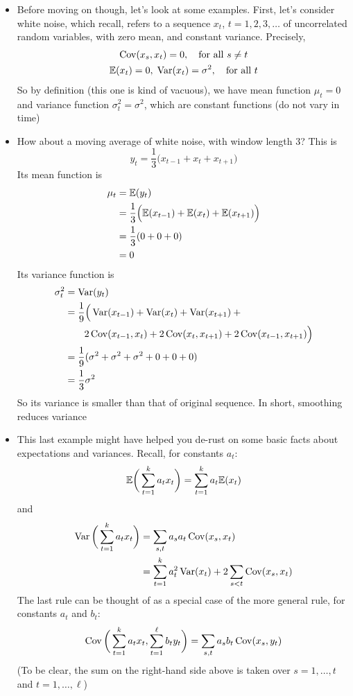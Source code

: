 \documentclass{article}
\begin{document}
\begin{itemize}
\item Before moving on though, let's look at some examples. First, let's
  consider white noise, which recall, refers to a sequence $x_t$, $t =
  1,2,3,\dots$ of uncorrelated random variables, with zero mean, and constant
  variance. Precisely,   
  \begin{gather*}
  \operatorname{Cov}(x_s, x_t) = 0, \quad \text{for all $s \not= t$} \\
  \mathbb{E}(x_t) = 0, \; \operatorname{Var}(x_t) = \sigma^2, \quad \text{for all $t$} 
  \end{gather*}
  So by definition (this one is kind of vacuous), we have mean function $\mu_t =
  0$ and variance function $\sigma^2_t = \sigma^2$, which are constant functions
  (do not vary in time)

\item How about a moving average of white noise, with window length 3? This is 
  \[
  y_t = \frac{1}{3} \Big( x_{t-1} + x_t + x_{t+1} \Big)
  \]
  Its mean function is
  \begin{align*}
  \mu_t &= \mathbb{E}(y_t)  \\
  &= \frac{1}{3} \Big( \mathbb{E}(x_{t-1}) + \mathbb{E}(x_t) + \mathbb{E}(x_{t+1}) \Big) \\ 
  &= \frac{1}{3} ( 0 + 0 + 0 ) \\
  &= 0
  \end{align*}
  Its variance function is
  \begin{align*}
  \sigma^2_t &= \operatorname{Var}(y_t) \\
  &= \frac{1}{9} \Big( \operatorname{Var}(x_{t-1}) + \operatorname{Var}(x_t) + \operatorname{Var}(x_{t+1}) +{} \\
  &\qquad 2 \operatorname{Cov}(x_{t-1}, x_t) + 2 \operatorname{Cov}(x_t, x_{t+1}) + 2 \operatorname{Cov}(x_{t-1}, x_{t+1}) 
    \Big) \\
  &= \frac{1}{9} ( \sigma^2 + \sigma^2 + \sigma^2 + 0 + 0 + 0) \\
  &= \frac{1}{3} \sigma^2
  \end{align*}
  So its variance is smaller than that of original sequence. In short, smoothing
  reduces variance 

\item This last example might have helped you de-rust on some basic facts about
  expectations and variances. Recall, for constants $a_t$:
  \[
  \mathbb{E}\bigg( \sum_{t=1}^k a_t x_t \bigg) = \sum_{t=1}^k a_t \mathbb{E}(x_t)
  \]
  and 
  \begin{align*}
  \operatorname{Var}\bigg( \sum_{t=1}^k a_t x_t \bigg) 
  &= \sum_{s,t} a_s a_t \operatorname{Cov}(x_s, x_t) \\
  &= \sum_{t=1}^k a_t^2 \operatorname{Var}(x_t) + 2 \sum_{s < t} \operatorname{Cov}(x_s, x_t)
  \end{align*}
  The last rule can be thought of as a special case of the more general rule,
  for constants $a_t$ and $b_t$: 
  \[
  \operatorname{Cov}\bigg( \sum_{t=1}^k a_t x_t, \sum_{t=1}^\ell b_t y_t \bigg) 
  = \sum_{s,t} a_s b_t \operatorname{Cov}(x_s, y_t)
  \]
  (To be clear, the sum on the right-hand side above is taken over $s =
  1,\dots,t$ and $t = 1,\dots,\ell$) 


\end{itemize}
\end{document}
